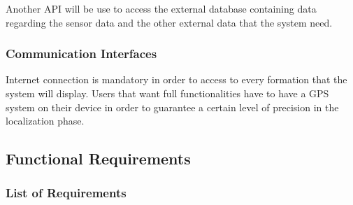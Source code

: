 \documentclass[table, 12pt]{article}
\begin{document}
Another API will be use to access the external database containing data regarding the sensor data and the other external data that the system need.

\subsubsection{Communication Interfaces}
Internet connection is mandatory in order to access to every formation that the system will display.
Users that want full functionalities have to have a GPS system on their device in order to guarantee a certain level of precision in the localization phase.

\subsection{Functional Requirements}

\subsubsection{List of Requirements}
\end{document}
